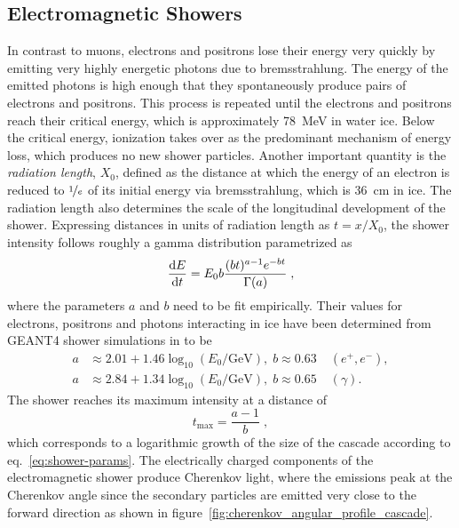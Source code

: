 \subsection{Electromagnetic Showers}
\label{sec:em-showers}
In contrast to muons, electrons and positrons lose their energy very quickly by emitting very highly energetic photons due to bremsstrahlung. The energy of the emitted photons is high enough that they spontaneously produce pairs of electrons and positrons. This process is repeated until the electrons and positrons reach their critical energy, which is approximately 78~MeV in water ice. Below the critical energy, ionization takes over as the predominant mechanism of energy loss, which produces no new shower particles. Another important quantity is the \emph{radiation length}, $X_0$, defined as the distance at which the energy of an electron is reduced to $\nicefrac{1}{e}$ of its initial energy via bremsstrahlung, which is 36~cm in ice\cite{pdg}. The radiation length also determines the scale of the longitudinal development of the shower. Expressing distances in units of radiation length as $t=x/X_0$, the shower intensity follows roughly a gamma distribution parametrized as
\begin{equation}
    \frac{\mathrm{d} E}{\mathrm{d} t} = E_0 b \frac{(bt)^{a-1}e^{-bt}}{\Gamma(a)}\;,
\end{equation}
where the parameters $a$ and $b$ need to be fit empirically\cite{pdg}. Their values for electrons, positrons and photons interacting in ice have been determined from GEANT4 shower simulations in to be
\begin{align}
    a &\approx 2.01 + 1.46 \log_{10}(E_0/\mathrm{GeV}),\; b\approx 0.63\; & (e^+,e^-), \\
    a &\approx 2.84 + 1.34 \log_{10}(E_0/\mathrm{GeV}),\; b\approx 0.65\; & (\gamma).\label{eq:shower-params}
\end{align}
The shower reaches its maximum intensity at a distance of
\begin{equation}
    t_{\mathrm{max}}=\frac{a-1}{b}\;,
\end{equation}
which corresponds to a logarithmic growth of the size of the cascade according to eq.~\ref{eq:shower-params}. The electrically charged components of the electromagnetic shower produce Cherenkov light, where the emissions peak at the Cherenkov angle since the secondary particles are emitted very close to the forward direction as shown in figure~\ref{fig:cherenkov_angular_profile_cascade}.

